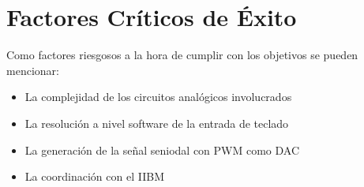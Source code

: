 \section{Factores Críticos de Éxito}
Como factores riesgosos a la hora de cumplir con los objetivos se pueden mencionar:
\begin{itemize}
    \item La complejidad de los circuitos analógicos involucrados
    \item La resolución a nivel software de la entrada de teclado
    \item La generación de la señal seniodal con PWM como DAC
    \item La coordinación con el IIBM
\end{itemize}
